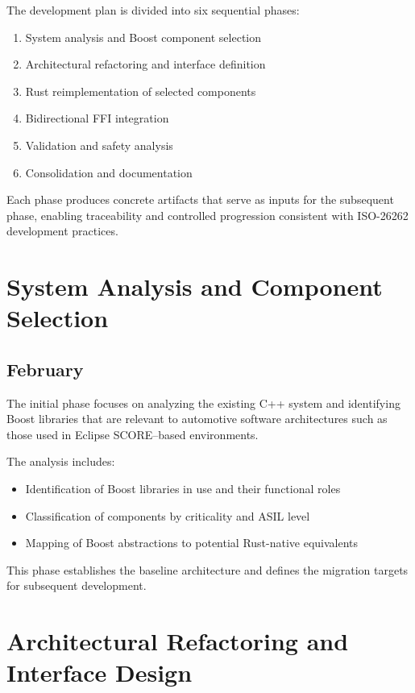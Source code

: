 The development plan is divided into six sequential phases:

\begin{enumerate}
    \item System analysis and Boost component selection
    \item Architectural refactoring and interface definition
    \item Rust reimplementation of selected components
    \item Bidirectional \gls{FFI} integration
    \item Validation and safety analysis
    \item Consolidation and documentation
\end{enumerate}

Each phase produces concrete artifacts that serve as inputs for the subsequent
phase, enabling traceability and controlled progression consistent with
ISO-26262 development practices.

\section{System Analysis and Component Selection}

\subsection*{February}

The initial phase focuses on analyzing the existing C++ system and identifying
Boost libraries that are relevant to automotive software architectures such as
those used in Eclipse SCORE–based environments.

The analysis includes:
\begin{itemize}
    \item Identification of Boost libraries in use and their functional roles
    \item Classification of components by criticality and \gls{ASIL} level
    \item Mapping of Boost abstractions to potential Rust-native equivalents
\end{itemize}

This phase establishes the baseline architecture and defines the migration
targets for subsequent development.

\section{Architectural Refactoring and Interface Design}

